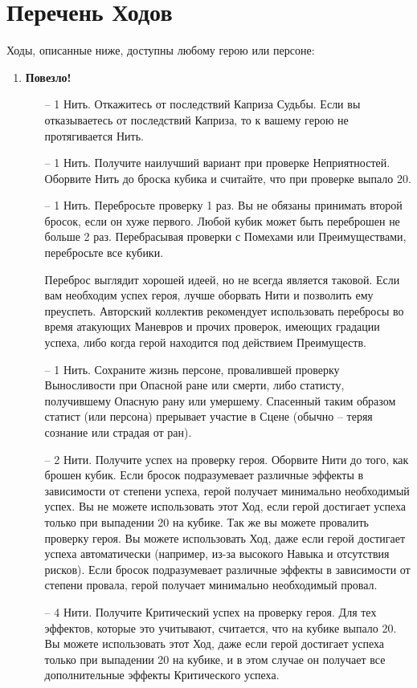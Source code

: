 \section{Перечень Ходов}
Ходы, описанные ниже, доступны любому герою или персоне:
\begin{enumerate}
\item \textbf{Повезло!}
\begin{itemize}
\item[--] 1 Нить. Откажитесь от последствий Каприза Судьбы. Если вы отказываетесь от последствий Каприза, то к вашему герою не протягивается Нить.
\item[--] 1 Нить. Получите наилучший вариант при проверке Неприятностей. Оборвите Нить до броска кубика и считайте, что при проверке выпало 20.
\item[--] 1 Нить. Перебросьте проверку 1 раз. Вы не обязаны принимать второй бросок, если он хуже первого. Любой кубик может быть переброшен не больше 2 раз. Перебрасывая проверки с Помехами или Преимуществами, перебросьте все кубики.
\begin{tcolorbox}
Переброс выглядит хорошей идеей, но не всегда является таковой. Если вам необходим успех героя, лучше оборвать Нити и позволить ему преуспеть. Авторский коллектив рекомендует использовать перебросы во время атакующих Маневров и прочих проверок, имеющих градации успеха, либо когда герой находится под действием Преимуществ.
\end{tcolorbox}
\item[--] 1 Нить. Сохраните жизнь персоне, провалившей проверку Выносливости при Опасной ране или смерти, либо статисту, получившему Опасную рану или умершему. Спасенный таким образом статист (или персона) прерывает участие в Сцене (обычно – теряя сознание или страдая от ран).
\item[--] 2 Нити. Получите успех на проверку героя. Оборвите Нити до того, как брошен кубик. Если бросок подразумевает различные эффекты в зависимости от степени успеха, герой получает минимально необходимый успех. Вы не можете использовать этот Ход, если герой достигает успеха только при выпадении 20 на кубике.
\newline Так же вы можете провалить проверку героя. Вы можете использовать Ход, даже если герой достигает успеха автоматически (например, из-за высокого Навыка и отсутствия рисков). Если бросок подразумевает различные эффекты в зависимости от степени провала, герой получает минимально необходимый провал. 
\item[--] 4 Нити. Получите Критический успех на проверку героя. Для тех эффектов, которые это учитывают, считается, что на кубике выпало 20. Вы можете использовать этот Ход, даже если герой достигает успеха только при выпадении 20 на кубике, и в этом случае он получает все дополнительные эффекты Критического успеха.

\end{itemize}
\end{enumerate}
